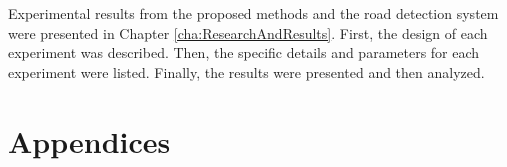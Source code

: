 \documentclass[a4paper]{book}
\begin{document}
Experimental results from the proposed methods and the road detection system were presented in Chapter \ref{cha:ResearchAndResults}. First, the design of each experiment was described. Then, the specific details and parameters for each experiment were listed. Finally, the results were presented and then analyzed.\\







\backmatter


\appendix
\chapter*{Appendices}
\renewcommand{\thesection}{\Alph{section}}




\end{document}
